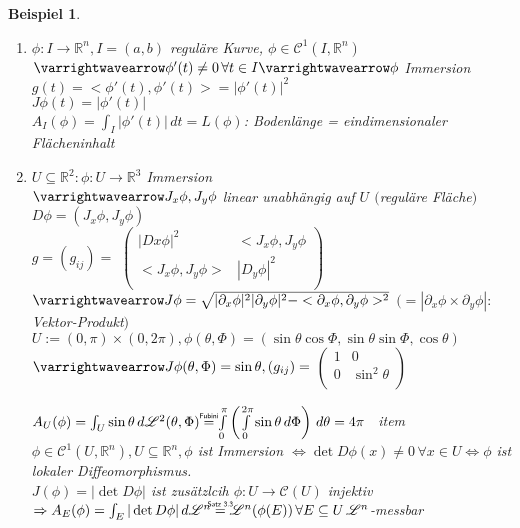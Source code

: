 \documentclass[11pt]{memoir}
\theoremstyle{changebreak}
\newtheorem{Beispiel}{Beispiel}[chapter]
\newcommand\overequal[1]{\mathrel{\overset{\makebox[0pt]{\mbox{\normalfont\tiny\sffamily $ #1 $}}}{=}}}
\begin{document}
\begin{Beispiel}
\begin{enumerate}
	\item $\phi: I \rightarrow \mathbb R^n, I = (a, b)$ reguläre Kurve, $\phi \in \mathscr C^1(I, \mathbb R^n)$ $\varrightwavearrow \phi'(t) \ne 0 \, \forall t\in I \varrightwavearrow \phi$ Immersion \\
	$g(t) = <\phi'(t), \phi'(t) > = |\phi'(t)|^2$ \\
	$J\phi(t) = |\phi'(t)|$ \\
	$A_I(\phi) = \int_I |\phi'(t)|\, dt = L(\phi)$: Bodenlänge = eindimensionaler Flächeninhalt

	\item $U \subseteq \mathbb R^2: \phi: U \rightarrow \mathbb R^3$ Immersion \\
	$\varrightwavearrow J_x \phi, J_y \phi$ linear unabhängig auf $U$ $($reguläre Fläche$)$\\
	$D\phi = (J_x \phi, J_y \phi)$ \\
	$g= (g_{ij}) =$
	$\begin{pmatrix}
      		|Dx\phi|^2 & 	<J_x\phi, J_y\phi \\
      		<J_x\phi, J_y\phi> &  	|D_y\phi|^2 \\
	\end{pmatrix}$ \\
	$\varrightwavearrow J\phi = \sqrt{|\partial_x \phi|^2 |\partial_y \phi|^2 - <\partial_x\phi, \partial_y\phi>^2}$ $(= |\partial_x\phi \times \partial_y \phi|: $Vektor-Produkt$)$ \\
	$U:= (0, \pi) \times (0, 2\pi), \phi(\theta, \Phi) = (\sin\theta\cos\Phi, \sin\theta\sin\Phi, \cos\theta)$ \\
	$\varrightwavearrow J\phi(\theta, \Phi) = \sin\theta, (g_{ij}) = $
	$\begin{pmatrix}
		1 & 0 \\
		0 & \sin^2 \theta \\
	\end{pmatrix}$


	$A_U(\phi) = \int_U \sin\theta\,d\mathscr L^2(\theta, \Phi) \overequal{\text{Fubini}} \int\limits_0^\pi \left( \int\limits_0^{2\pi} \sin\theta \, d\Phi\right) \,d\theta = 4 \pi$
	\
	item $\phi \in \mathscr C^1(U, \mathbb R^n), U \subseteq \mathbb R^n, \phi$ ist Immersion $\Leftrightarrow \det D\phi(x) \ne 0 \, \forall x \in U \Leftrightarrow \phi$ ist lokaler Diffeomorphismus. \\
	$J(\phi)= |\det D\phi|$ ist zusätzlcih $\phi: U \rightarrow \mathscr C(U)$ injektiv \\
	$\Rightarrow A_E (\phi) = \int_E |\det D\phi|\, d\mathscr L^n \overequal{\text{Satz 3.3}} \mathscr L^n(\phi(E)) \, \forall E \subseteq U \, \mathscr L^n$-messbar


\end{enumerate}
\end{Beispiel}
\end{document}
